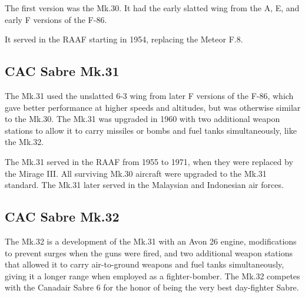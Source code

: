 The first version was the Mk.30. It had the early slatted wing from the A, E, and early F versions of the F-86.%

It served in the RAAF starting in 1954, replacing the Meteor F.8.

\subsection{CAC Sabre Mk.31}

The Mk.31 used the unslatted 6-3 wing from later F versions of the F-86, which gave better performance at higher speeds and altitudes, but was otherwise similar to the Mk.30. The Mk.31 was upgraded in 1960 with two additional weapon stations to allow it to carry missiles or bombs and fuel tanks simultaneously, like the Mk.32.%

The Mk.31 served in the RAAF from 1955 to 1971, when they were replaced by the Mirage III. All surviving Mk.30 aircraft were upgraded to the Mk.31 standard. The Mk.31 later served in the Malaysian and Indonesian air forces.

\subsection{CAC Sabre Mk.32}

The Mk.32 is a development of the Mk.31 with an Avon 26 engine, modifications to prevent surges when the guns were fired, and two additional weapon stations that allowed it to carry air-to-ground weapons and fuel tanks simultaneously, giving it a longer range when employed as a fighter-bomber. The Mk.32 competes with the Canadair Sabre 6 for the honor of being the very best day-fighter Sabre.%

